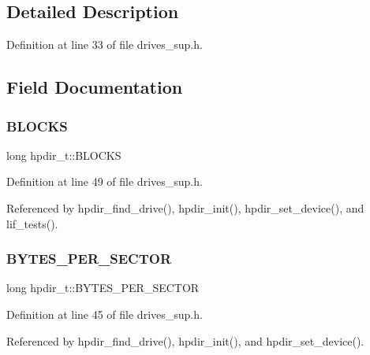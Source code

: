 \subsection{Detailed Description}


Definition at line 33 of file drives\+\_\+sup.\+h.



\subsection{Field Documentation}
\mbox{\label{structhpdir__t_a4b4f32c9b9cfe558ce5fbd51d65b5db3}} 
\subsubsection{\texorpdfstring{B\+L\+O\+C\+KS}{BLOCKS}}
{\footnotesize\ttfamily long hpdir\+\_\+t\+::\+B\+L\+O\+C\+KS}



Definition at line 49 of file drives\+\_\+sup.\+h.



Referenced by hpdir\+\_\+find\+\_\+drive(), hpdir\+\_\+init(), hpdir\+\_\+set\+\_\+device(), and lif\+\_\+tests().

\mbox{\label{structhpdir__t_a18355478edba37fb7b2b0bca2448d247}} 
\subsubsection{\texorpdfstring{B\+Y\+T\+E\+S\+\_\+\+P\+E\+R\+\_\+\+S\+E\+C\+T\+OR}{BYTES\_PER\_SECTOR}}
{\footnotesize\ttfamily long hpdir\+\_\+t\+::\+B\+Y\+T\+E\+S\+\_\+\+P\+E\+R\+\_\+\+S\+E\+C\+T\+OR}



Definition at line 45 of file drives\+\_\+sup.\+h.



Referenced by hpdir\+\_\+find\+\_\+drive(), hpdir\+\_\+init(), and hpdir\+\_\+set\+\_\+device().

